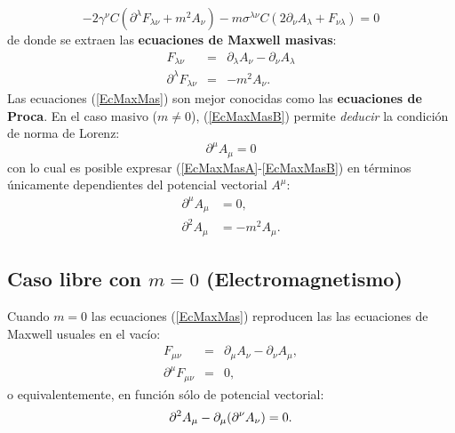 \begin{equation}\label{}
-2\gamma^\nu C(\partial^\lambda F_{\lambda \nu}+m^2 A_\nu)-m \sigma^{\lambda\nu}C (2\partial_\nu A_\lambda + F_{\nu\lambda})=0
\end{equation}
de donde se extraen las \textbf{ecuaciones de Maxwell masivas}:
\begin{subequations}\label{EcMaxMas}
 \begin{eqnarray}
  F_{\lambda \nu} & = & \partial_\lambda A_\nu - \partial_\nu A_\lambda \label{EcMaxMasA}\\
  \partial^{\lambda}F_{\lambda \nu} & = & -m^2 A_\nu. \label{EcMaxMasB}
\end{eqnarray}
\end{subequations}
Las ecuaciones (\ref{EcMaxMas}) son mejor conocidas como las \textbf{ecuaciones de Proca}\citep{Proca,GreinerRQM}. En el caso masivo ($m\neq 0$), (\ref{EcMaxMasB}) permite \textit{deducir} la condición de norma de Lorenz:
\begin{equation}\label{NormaLorenz}
 \partial^\mu A_\mu =0
\end{equation}
con lo cual es posible expresar (\ref{EcMaxMasA}-\ref{EcMaxMasB}) en términos únicamente dependientes del potencial vectorial $A^\mu$:
\begin{subequations}\label{EcMaxMasVectorial}
 \begin{align}
  \partial^\mu A_\mu &=0,\\
  \partial^2 A_\mu  &=-m^2 A_\mu.
 \end{align}
\end{subequations}

\subsection{Caso libre con \texorpdfstring{$m=0$}{m=0} (Electromagnetismo)}
\label{subsec:EBWm0}

Cuando $m=0$ las ecuaciones (\ref{EcMaxMas}) reproducen las las ecuaciones de Maxwell usuales en el vacío:
\begin{subequations}\label{EcMaxNoMas}
 \begin{eqnarray}
  F_{\mu\nu} & = & \partial_\mu A_\nu -\partial_\nu A_\mu,\\
  \partial^{\mu}F_{\mu\nu}&=&0,
 \end{eqnarray}
\end{subequations}
o equivalentemente, en función sólo de potencial vectorial:
\begin{equation}\label{EcMaxNoMasVectorial}
 \partial^2 A_\mu-\partial_\mu (\partial^\nu A_\nu)=0.\\
\end{equation}

